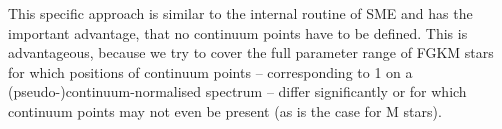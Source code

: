 \documentclass[
  journal=pasa,
  manuscript=research-paper, %
  year=2021,
  volume=37
]{cup-journal}
\newcommand{\SB}[1]{{\textcolor{purple}{#1}}}
\newcommand{\Teff}{$T_\mathrm{eff}$\xspace}
\newcommand{\vrad}{$v_\mathrm{rad}$\xspace}
\begin{document}
This specific approach is similar to the internal routine of \textsc{SME} \citep{Piskunov2017} and has the important advantage, that no continuum points have to be defined. This is advantageous, because we try to cover the full parameter range of FGKM stars for which positions of continuum points -- corresponding to 1 on a (pseudo-)continuum-normalised spectrum -- differ significantly or for which continuum points may not even be present (as is the case for M stars).




\end{document}
